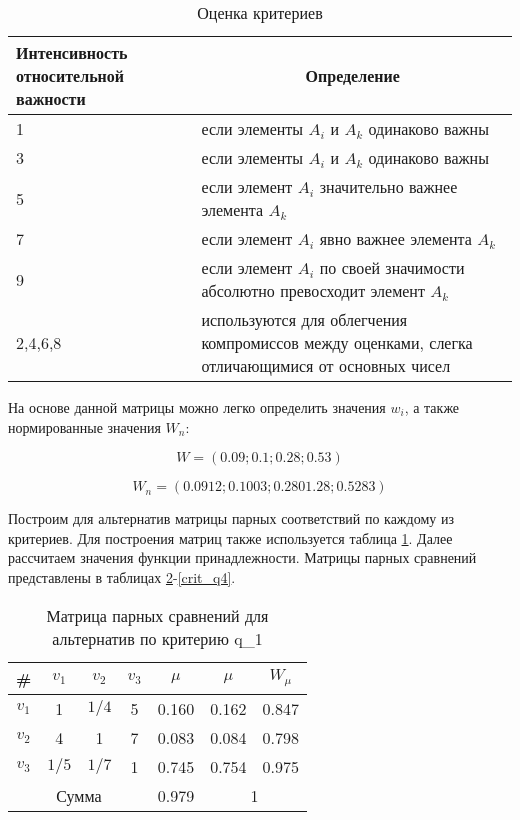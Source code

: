 \begin{table}[H]
  \caption{Оценка критериев}\label{crit_scale}
  \begin{tabular}{|p{4cm}|p{12cm}|}
  \hline Интенсивность относительной важности & \multicolumn{1}{|c|}{Определение} \\
  \hline 1 & если элементы $A_i$ и $A_k$ одинаково важны \\
  \hline 3 & если элементы $A_i$ и $A_k$ одинаково важны \\
  \hline 5 & если элемент $A_i$ значительно важнее элемента $A_k$ \\
  \hline 7 & если элемент $A_i$ явно важнее элемента $A_k$ \\
  \hline 9 & если элемент $A_i$ по своей значимости абсолютно превосходит элемент $A_k$ \\
  \hline 2,4,6,8 & используются для облегчения компромиссов между оценками, слегка отличающимися от основных чисел \\
  \hline
  \end{tabular}
\end{table}

На основе данной матрицы можно легко определить значения $w_i$, а также нормированные значения $W_n$:

\begin{equation}
    W=(0.09;0.1;0.28;0.53)
\end{equation}

\begin{equation}
    W_n=(0.0912;0.1003;0.2801.28;0.5283)
\end{equation}

Построим для альтернатив матрицы парных соответствий по каждому из критериев. 
Для построения матриц также используется таблица \ref{crit_scale}. 
Далее рассчитаем значения функции принадлежности.
Матрицы парных сравнений представлены в таблицах \ref{crit_q1}-\ref{crit_q4}.

\begin{table}[H]
    \centering
    \caption{Матрица парных сравнений для альтернатив по критерию q_1}\label{crit_q1}
    \begin{tabular}{|c|c|c|c|c|c|c|}
    \hline \# & $v_1$ & $v_2$ & $v_3$ & $\mu$ & $\mu$ & $W_{\mu}$ \\
    \hline $v_1$ & 1 & $1/4$ & 5 & 0.160 & 0.162 & 0.847 \\
    \hline $v_2$ & 4 & 1 & 7 &  0.083 & 0.084 & 0.798\\
    \hline $v_3$ & $1/5$ & $1/7$ & 1 & 0.745 & 0.754 & 0.975 \\
    \hline \multicolumn{4}{|c|}{Сумма} & 0.979 & \multicolumn{2}{|c|}{1} \\
    \hline
    \end{tabular}
\end{table}

